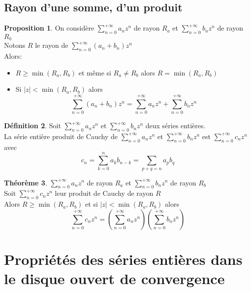 \documentclass[10pt,a4paper]{article}
\theoremstyle{definition}
\newtheorem{proposition}{Proposition}[section]
\newtheorem{theorem}[proposition]{Théorème}
\newtheorem{definition}[proposition]{Définition}
\begin{document}
\subsection{Rayon d'une somme, d'un produit}
\begin{proposition}
    On considère \(\sum\limits_{n = 0}^{+\infty} a_n z^n\) de rayon \(R_a\) et \(\sum\limits_{n = 0}^{+\infty} b_n z^n\) de rayon \(R_b\) \\
    Notons \(R\) le rayon de \(\sum\limits_{n = 0}^{+\infty} (a_n + b_n) z^n\) \\
    Alors:
    \begin{itemize}
        \item  \(R \geq \min(R_a, R_b)\) et même si \(R_a \neq R_b\) alors \(R = \min(R_a, R_b)\)
        \item  Si \(|z| < \min(R_a, R_b)\) alors
        \[\sum_{n = 0}^{+\infty}(a_n + b_n) z^n = \sum_{n = 0}^{+\infty} a_n z^n + \sum_{n = 0}^{+\infty} b_n z^n\]
    \end{itemize}
\end{proposition}
\begin{definition}
    Soit \(\sum\limits_{n = 0}^{+\infty} a_n z^n\) et \(\sum\limits_{n = 0}^{+\infty} b_n z^n\) deux séries entières. \\
    La série entière produit de Cauchy de \(\sum\limits_{n = 0}^{+\infty} a_n z^n\) et \(\sum\limits_{n = 0}^{+\infty} b_n z^n\) est \(\sum\limits_{n = 0}^{+\infty} c_n z^n\) avec
    \[c_n = \sum_{k = 0}^{n} a_k b_{n - k} = \sum_{p + q = n} a_p b_q\]
\end{definition}
\begin{theorem}
    \(\sum\limits_{n = 0}^{+\infty} a_n z^n\) de rayon \(R_a\) et \(\sum\limits_{n = 0}^{+\infty} b_n z^n\) de rayon \(R_b\) \\
    Soit \(\sum\limits_{n = 0}^{+\infty} c_n z^n\) leur produit de Cauchy de rayon \(R\) \\
    Alors \(R \geq \min(R_a, R_b)\) et si \(|z| < \min(R_a, R_b)\) alors
    \[\boxed{\sum_{n = 0}^{+\infty}c_n z^n = \left(\sum_{n = 0}^{+\infty}a_n z^n\right) \left(\sum_{n = 0}^{+\infty} b_n z^n\right)}\]
\end{theorem}

\section{Propriétés des séries entières dans le disque ouvert de convergence}
\end{document}

